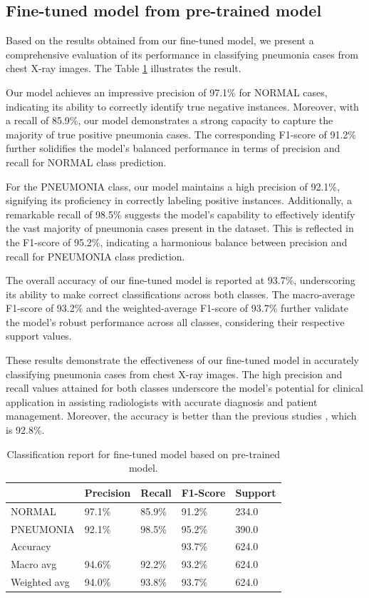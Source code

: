 \documentclass{article}
\begin{document}
\subsection{Fine-tuned model from pre-trained model}
Based on the results obtained from our fine-tuned model, we present a comprehensive evaluation of its performance in classifying pneumonia cases from chest X-ray images. The Table \ref{tab:table2} illustrates the result.

Our model achieves an impressive precision of 97.1\% for NORMAL cases, indicating its ability to correctly identify true negative instances. Moreover, with a recall of 85.9\%, our model demonstrates a strong capacity to capture the majority of true positive pneumonia cases. The corresponding F1-score of 91.2\% further solidifies the model's balanced performance in terms of precision and recall for NORMAL class prediction.

For the PNEUMONIA class, our model maintains a high precision of 92.1\%, signifying its proficiency in correctly labeling positive instances. Additionally, a remarkable recall of 98.5\% suggests the model's capability to effectively identify the vast majority of pneumonia cases present in the dataset. This is reflected in the F1-score of 95.2\%, indicating a harmonious balance between precision and recall for PNEUMONIA class prediction.

The overall accuracy of our fine-tuned model is reported at 93.7\%, underscoring its ability to make correct classifications across both classes. The macro-average F1-score of 93.2\% and the weighted-average F1-score of 93.7\% further validate the model's robust performance across all classes, considering their respective support values.

These results demonstrate the effectiveness of our fine-tuned model in accurately classifying pneumonia cases from chest X-ray images. The high precision and recall values attained for both classes underscore the model's potential for clinical application in assisting radiologists with accurate diagnosis and patient management. Moreover, the accuracy is better than the previous studies \cite{KERMANY20181122}, which is 92.8\%.

\begin{table}[!htb]
  \caption{Classification report for fine-tuned model based on pre-trained model.}
  \centering
  \begin{tabular}{lllll}
    \toprule
    \cmidrule(r){1-4}
                 & Precision & Recall & F1-Score & Support \\
    \midrule
    NORMAL       & 97.1\%    & 85.9\% & 91.2\%   & 234.0   \\
    PNEUMONIA    & 92.1\%    & 98.5\% & 95.2\%   & 390.0   \\
    Accuracy     &           &        & 93.7\%   & 624.0   \\
    Macro avg    & 94.6\%    & 92.2\% & 93.2\%   & 624.0   \\
    Weighted avg & 94.0\%    & 93.8\% & 93.7\%   & 624.0   \\
    \bottomrule
  \end{tabular}
  \label{tab:table2}
\end{table}
\end{document}
